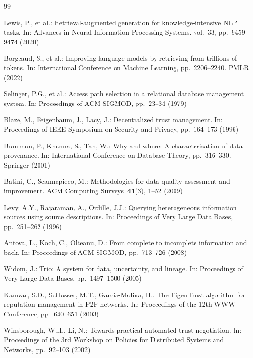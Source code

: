 \documentclass[runningheads]{llncs}
\begin{document}
\begin{thebibliography}{99}

Lewis, P., et al.:
Retrieval-augmented generation for knowledge-intensive NLP tasks.
In: Advances in Neural Information Processing Systems. vol.~33,
pp.~9459--9474 (2020)

Borgeaud, S., et al.:
Improving language models by retrieving from trillions of tokens.
In: International Conference on Machine Learning,
pp.~2206--2240. PMLR (2022)

Selinger, P.G., et al.:
Access path selection in a relational database management system.
In: Proceedings of ACM SIGMOD, pp.~23--34 (1979)

Blaze, M., Feigenbaum, J., Lacy, J.:
Decentralized trust management.
In: Proceedings of IEEE Symposium on Security and Privacy,
pp.~164--173 (1996)

Buneman, P., Khanna, S., Tan, W.:
Why and where: A characterization of data provenance.
In: International Conference on Database Theory,
pp.~316--330. Springer (2001)

Batini, C., Scannapieco, M.:
Methodologies for data quality assessment and improvement.
ACM Computing Surveys~\textbf{41}(3), 1--52 (2009)

Levy, A.Y., Rajaraman, A., Ordille, J.J.:
Querying heterogeneous information sources using source descriptions.
In: Proceedings of Very Large Data Bases, pp.~251--262 (1996)

Antova, L., Koch, C., Olteanu, D.:
From complete to incomplete information and back.
In: Proceedings of ACM SIGMOD, pp.~713--726 (2008)

Widom, J.:
Trio: A system for data, uncertainty, and lineage.
In: Proceedings of Very Large Data Bases, pp.~1497--1500 (2005)

Kamvar, S.D., Schlosser, M.T., Garcia-Molina, H.:
The EigenTrust algorithm for reputation management in P2P networks.
In: Proceedings of the 12th WWW Conference, pp.~640--651 (2003)

Winsborough, W.H., Li, N.:
Towards practical automated trust negotiation.
In: Proceedings of the 3rd Workshop on Policies for Distributed
Systems and Networks, pp.~92--103 (2002)


\end{thebibliography}
\end{document}
